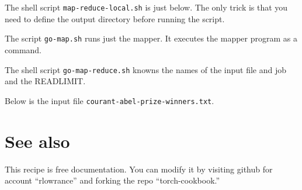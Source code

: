 \documentclass{article}
\let\code\texttt %
\begin{document}


The shell script \code{map-reduce-local.sh} is just below. The only
trick is that you need to define the output directory before running the
script.



The script \code{go-map.sh} runs just
the mapper. It executes the mapper program as a command.



The shell script \code{go-map-reduce.sh} knowns the names of the input
file and job and the READLIMIT.




Below is the input file \code{courant-abel-prize-winners.txt}.



\section{See also}

This recipe is free documentation. You can modify it by visiting
github for account ``rlowrance'' and forking the repo
``torch-cookbook.''
\end{document}
